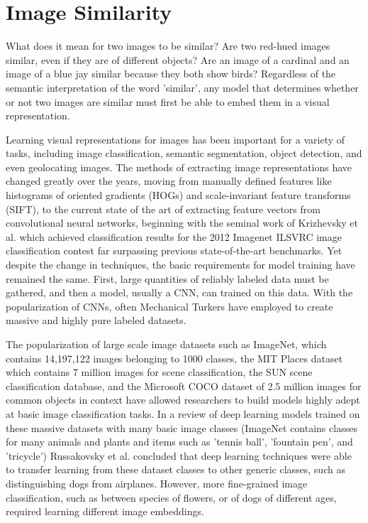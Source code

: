 
\section{Image Similarity}
What does it mean for two images to be similar? Are two red-hued images similar, even if they are of different objects? Are an image of a cardinal and an image of a blue jay similar because they both show birds? Regardless of the semantic interpretation of the word 'similar', any model that determines whether or not two images are similar must first be able to embed them in a visual representation.

Learning visual representations for images has been important for a variety of tasks, including image classification, semantic segmentation, object detection, and even geolocating images. The methods of extracting image representations have changed greatly over the years, moving from manually defined features like histograms of oriented gradients (HOGs) and scale-invariant feature transforms (SIFT)\cite{lowe1999object}\cite{dalal2005histograms}, to the current state of the art of extracting feature vectors from convolutional neural networks, beginning with the seminal work of Krizhevsky et al. which achieved classification results for the 2012 Imagenet ILSVRC image classification contest far surpassing previous state-of-the-art benchmarks\cite{krizhevsky2012imagenet}. Yet despite the change in techniques, the basic requirements for model training have remained the same. First, large quantities of reliably labeled data must be gathered, and then a model, usually a CNN, can trained on this data. With the popularization of CNNs, often Mechanical Turkers have employed to create massive and highly pure labeled datasets.

The popularization of large scale image datasets such as ImageNet, which contains 14,197,122 images belonging to 1000 classes\cite{deng2009imagenet}, the MIT Places dataset which contains 7 million images for scene classification\cite{zhou2014learning}, the SUN scene classification database\cite{xiao2010sun}, and the Microsoft COCO dataset of 2.5 million images for common objects in context\cite{lin2014microsoft} have allowed researchers to build models highly adept at basic image classification tasks\cite{russakovsky2013detecting}. In a review of deep learning models trained on these massive datasets with many basic image classes (ImageNet contains classes for many animals and plants and items such as 'tennis ball', 'fountain pen', and 'tricycle') Russakovsky et al. concluded that deep learning techniques were able to transfer learning from these dataset classes to other generic classes, such as distinguishing dogs from airplanes.\cite{russakovsky2013detecting} However, more fine-grained image classification, such as between species of flowers, or of dogs of different ages, required learning different image embeddings.

